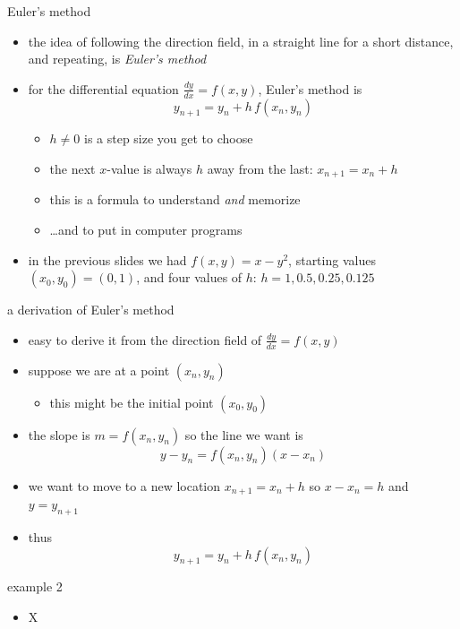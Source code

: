 \documentclass{beamer}
\begin{document}
\begin{frame}{Euler's method}

\begin{itemize}
\item the idea of following the direction field, in a straight line for a short distance, and repeating, is \emph{Euler's method}
\item for the differential equation $\frac{dy}{dx} = f(x,y)$, Euler's method is
        $$y_{n+1} = y_n + h\, f(x_n,y_n)$$

\vspace{-2mm}
    \begin{itemize}
    \item $h\ne 0$ is a step size you get to choose
    \item the next $x$-value is always $h$ away from the last: $x_{n+1} = x_n + h$
    \item this is a formula to understand \emph{and} memorize
    \item \dots and to put in computer programs
    \end{itemize}
\item in the previous slides we had $f(x,y)=x-y^2$, starting values $(x_0,y_0)=(0,1)$, and four values of $h$: $h=1,0.5,0.25,0.125$
\end{itemize}
\end{frame}


\begin{frame}{a derivation of Euler's method}

\begin{itemize}
\item easy to derive it from the direction field of $\frac{dy}{dx} = f(x,y)$
\item suppose we are at a point $(x_n,y_n)$
    \begin{itemize}
    \item this might be the initial point $(x_0,y_0)$
    \end{itemize}
\item the slope is $m=f(x_n,y_n)$ so the line we want is
    $$y-y_n = f(x_n,y_n)(x-x_n)$$
\item we want to move to a new location $x_{n+1}=x_n+h$ so $x-x_n=h$ and $y=y_{n+1}$
\item thus
    $$y_{n+1} = y_n + h\, f(x_n,y_n)$$
\end{itemize}
\end{frame}


\begin{frame}{example 2}

\begin{itemize}
\item X
\end{itemize}
\end{frame}
\end{document}
